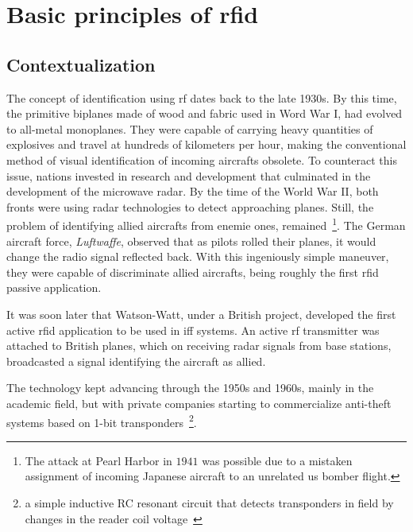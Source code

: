 \chapter{Basic principles of \acs{rfid}} \label{chapter:rfidprinciples}

\section{Contextualization} \label{sec:contextualization}

The concept of identification using \ac{rf} dates back to the late 1930s.
By this time, the primitive biplanes made of wood and fabric used in Word War I, had evolved to all-metal monoplanes. They were capable of carrying heavy quantities of explosives and travel at hundreds of kilometers per hour, making the conventional method of visual identification of incoming aircrafts obsolete.
To counteract this issue, nations invested in research and development that culminated in the development of the microwave radar.
By the time of the World War II, both fronts were using radar technologies to detect approaching planes. 
Still, the problem of identifying allied aircrafts from enemie ones, remained~\footnote{The attack at Pearl Harbor in $1941$ was possible due to a mistaken assignment of incoming Japanese aircraft to an unrelated \ac{us} bomber flight.}.
The German aircraft force, \emph{Luftwaffe}, observed that as pilots rolled their planes, it would change the radio signal reflected back. With this ingeniously simple maneuver, they were capable of discriminate allied aircrafts, being roughly the first \ac{rfid} passive application.~\cite{dobkinRFRFIDSecond2012}

It was soon later that Watson-Watt, under a British project, developed the first active \ac{rfid} application to be used in \ac{iff} systems. An active \ac{rf} transmitter was attached to British planes, which on receiving radar signals from base stations, broadcasted a signal identifying the aircraft as allied.~\cite{HistoryRFIDTechnology}


The technology kept advancing through the 1950s and 1960s, mainly in the academic field, but with private companies starting to commercialize anti-theft systems based on 1-bit transponders~\footnote{a simple inductive RC resonant circuit that detects transponders in field by changes in the reader coil voltage~\cite{andreventuradacruzmarnotozuqueteIdentificacaoPorRFID2018}}.

